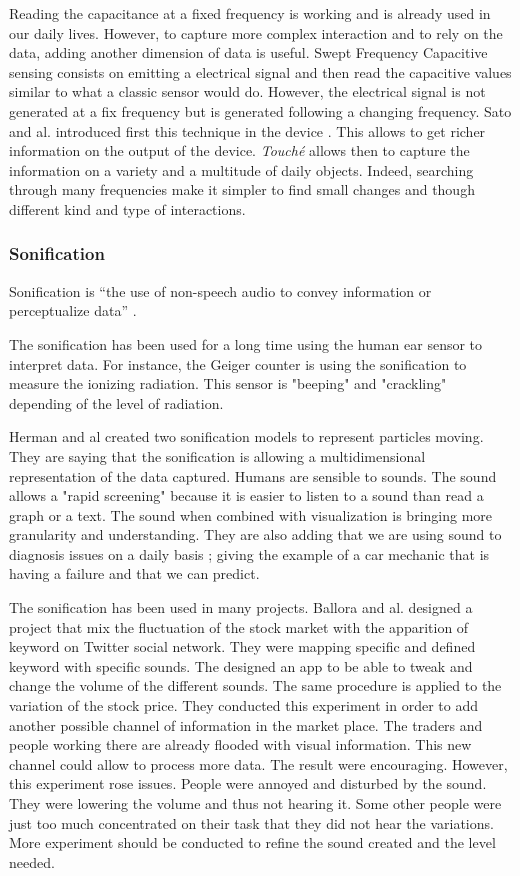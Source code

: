 Reading the capacitance at a fixed frequency is working and is already used in our daily lives. 
However, to capture more complex interaction and to rely on the data, adding another dimension of data is useful.
Swept Frequency Capacitive sensing consists on emitting a electrical signal and then read the capacitive values
similar to what a classic sensor would do. However, the electrical signal is not generated at a fix frequency
but is generated following a changing frequency. 
Sato and al. introduced first this technique in the  device \cite{satoToucheEnhancingTouch2012}.
This allows to get richer information on the output of the device. \textit{Touché} allows then to capture 
the information on a variety and a multitude of daily objects.
Indeed, searching through many frequencies make it simpler to find small changes and though different kind and type 
of interactions.

\subsubsection{Sonification}

Sonification is “the use of non-speech audio to convey information or perceptualize data” \cite{hermannListenYourData}.

The sonification has been used for a long time using the human ear sensor to interpret data. For instance, the Geiger counter is using the sonification to measure the ionizing radiation. This sensor is "beeping" and "crackling"
depending of the level of radiation.

Herman and al \cite{hermannListenYourData} created two sonification models to represent particles moving. They are 
saying that the sonification is allowing a multidimensional representation of the data captured.
Humans are sensible to sounds. The sound allows a "rapid screening" because it is easier to listen to a sound than
read a graph or a text. The sound when combined with visualization is bringing more granularity and understanding.
They are also adding that we are using sound to diagnosis issues on a daily basis ; giving the example of a car
mechanic that is having a failure and that we can predict.

The sonification has been used in many projects. Ballora and al. \cite{ballora2012use} designed a project that mix the fluctuation of the stock
market with the apparition of keyword on Twitter social network. They were mapping specific and defined keyword with specific
sounds. The designed an app to be able to tweak and change the volume of the different sounds. The same procedure 
is applied to the variation of the stock price.
They conducted this experiment in order to add another possible channel of information in the market place.
The traders and people working there are already flooded with visual information. This new channel could allow to 
process more data.
The result were encouraging. However, this experiment rose issues. People were annoyed and disturbed by the sound.
They were lowering the volume and thus not hearing it. Some other people were just too much concentrated on 
their task that they did not hear the variations.
More experiment should be conducted to refine the sound created and the level needed.

